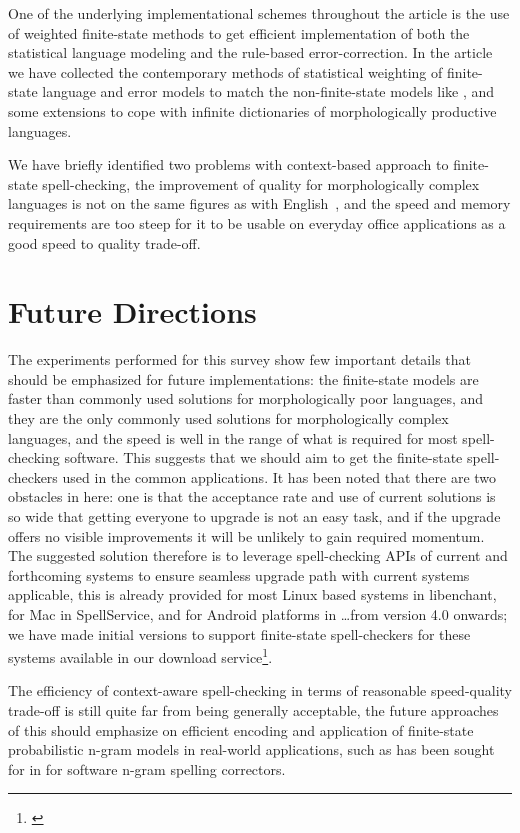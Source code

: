 \documentclass[a4paper,12pt]{article}
\begin{document}
One of the underlying implementational schemes throughout the article is the
use of weighted finite-state methods to get efficient implementation of both
the statistical language modeling and the rule-based error-correction. In the
article we have collected the contemporary methods of statistical weighting of
finite-state language and error models to match the non-finite-state models
like \cite{church1991probability}, and some extensions to cope with infinite
dictionaries of morphologically productive languages.

We have briefly identified two problems with context-based approach to
finite-state spell-checking, the improvement of quality for morphologically
complex languages is not on the same figures as with
English~\cite{wilcoxohearn2008realword}, and the speed and memory requirements
are too steep for it to be usable on everyday office applications as a good
speed to quality trade-off.

\section{Future Directions}
\label{sec:future}

The experiments performed for this survey show few important details that
should be emphasized for future implementations: the finite-state models are
faster than commonly used solutions for morphologically poor languages, and
they are the only commonly used solutions for morphologically complex
languages, and the speed is well in the range of what is required for most
spell-checking software. This suggests that we should aim to get the
finite-state spell-checkers used in the common applications. It has been noted
that there are two obstacles in here: one is that the acceptance rate and use
of current solutions is so wide that getting everyone to upgrade is not an
easy task, and if the upgrade offers no visible improvements it will be
unlikely to gain required momentum. The suggested solution therefore is to
leverage spell-checking APIs of current and forthcoming systems to ensure
seamless upgrade path with current systems applicable, this is already provided
for most Linux based systems in libenchant, for Mac in SpellService, and for
Android platforms in \ldots from version 4.0 onwards; we have made initial
versions to support finite-state spell-checkers for these systems available in
our download service\footnote{\url{}}.

The efficiency of context-aware spell-checking in terms of reasonable 
speed-quality trade-off is still quite far from being generally acceptable,
the future approaches of this should emphasize on efficient encoding and
application of finite-state probabilistic n-gram models in real-world
applications, such as has been sought for in \cite{} for software n-gram
spelling correctors.
\end{document}
